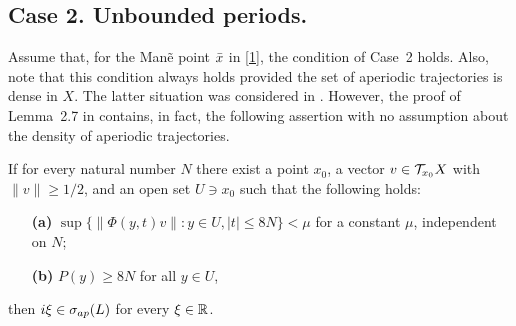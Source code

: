 \subsection{Case 2. Unbounded periods.}
Assume that, for the Man\~e point 
${\bar x}$ in \eqref{1}, the condition of Case~2 holds.
Also, note that this condition always holds 
provided the set of  aperiodic trajectories 
is dense in $X$. The latter situation was considered in \cite{clms}.
However, the proof of Lemma~2.7 in \cite{clms} contains, in fact, the 
following assertion with no assumption about the density of
aperiodic trajectories.
\begin{lem}
If for every
natural number $N$ there exist a point $x_0$, 
a vector $v\in{\cal{T}}_{x_0}X$
with $\|v\|\geq 1/2$, and 
an open set $U\ni x_0$
such that the following holds:
\begin{itemize}
\item[{\bf (a)}]
 $\sup\{\|\Phi(y,t)v\|: y\in U, |t|\leq 8N\} < \mu$ for
a constant $\mu$, independent on $N$;
\item[{\bf (b)}]  $P(y)\geq 8N$ for all $y\in U$,
\end{itemize}
then $i\xi\in\sigma_{ap}(L)$ for every $\xi\in{\Bbb{R}}$.
\end{lem}
